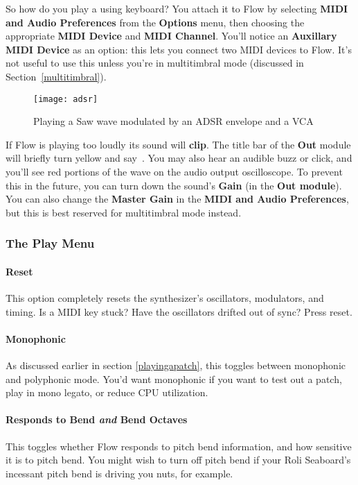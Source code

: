 \documentclass{article}
\newcommand\name{Flow}
\begin{document}
So how do you play a using keyboard?  You attach it to {\name} by selecting {\bf MIDI and Audio Preferences} from the {\bf Options} menu, then choosing the appropriate {\bf MIDI Device} and {\bf MIDI Channel}.  You'll notice an {\bf Auxillary MIDI Device} as an option: this lets you connect two MIDI devices to Flow.  It's not useful to use this unless you're in multitimbral mode (discussed in Section~\ref{multitimbral}).

\begin{wrapfigure}{r}{3in}
\texttt{[image: adsr]}
\caption{Playing a Saw wave modulated by an ADSR envelope and a VCA}
\vspace{-1em}
\label{adsr}
\end{wrapfigure}

If Flow is playing too loudly its sound will {\bf clip}. The title bar of the {\bf Out} module will briefly turn yellow and say \,.  You may also hear an audible buzz or click, and you'll see red portions of the wave on the audio output oscilloscope.  To prevent this in the future, you can turn down the sound's {\bf Gain} (in the {\bf Out module}).  You can also change the {\bf Master Gain} in the {\bf MIDI and Audio Preferences}, but this is best reserved for multitimbral mode instead.

\subsubsection{The Play Menu}

\paragraph{Reset}  This option completely resets the synthesizer's oscillators, modulators, and timing.  Is a MIDI key stuck?  Have the oscillators drifted out of sync?  Press reset.

\paragraph{Monophonic}  As discussed earlier in section \ref{playingapatch}, this toggles between monophonic and polyphonic mode.  You'd want monophonic if you want to test out a patch, play in mono legato, or reduce CPU utilization.

\paragraph{Responds to Bend \textit{and} Bend Octaves}  This toggles whether Flow responds to pitch bend information, and how sensitive it is to pitch bend. You might wish to turn off pitch bend if your Roli Seaboard's incessant pitch bend is driving you nuts, for example.
\end{document}
